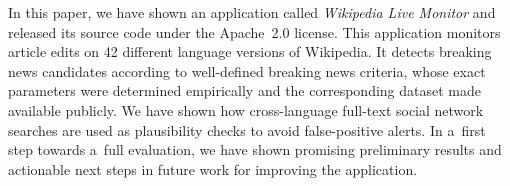\documentclass{www13-companion-accepted}
\begin{document}
In this paper, we have shown an application called \emph{Wikipedia Live Monitor}
and released its source code under the Apache~2.0 license.
This application monitors article edits on 42 different language versions of Wikipedia.
It detects breaking news candidates according to well-defined breaking news criteria,
whose exact parameters were determined empirically
and the corresponding dataset made available publicly.
We have shown how cross-language full-text social network searches are used
as plausibility checks to avoid false-positive alerts.
In a~first step towards a~full evaluation,
we have shown promising preliminary results
and actionable next steps in future work for improving the application.



\end{document}
